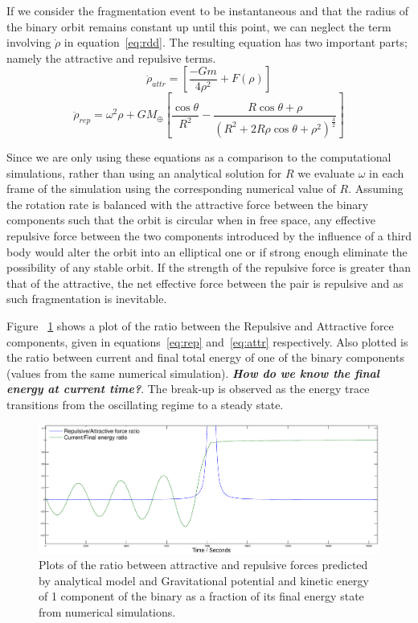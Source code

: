 \documentclass[letterpaper, preprint, paper,11pt]{AAS}	%
\begin{document}
If we consider the fragmentation event to be instantaneous and that the radius of the binary orbit remains constant up until this point, we can neglect the term involving $\dot{\rho}$ in equation~\ref{eq:rdd}. The resulting equation has two important parts; namely the attractive and repulsive terms.
\begin{equation} \label{eq:attr}
\ddot{\rho}_{attr} = \left[\frac{-Gm}{4\rho^{2}}+F(\rho)\right]
\end{equation}
\begin{equation} \label{eq:rep}
\ddot{\rho}_{rep} = \omega^{2}\rho+{GM_\oplus}\left[\frac{\cos\theta}{R^{2}}-\frac{R\cos\theta+\rho}{(R^{2}+2R\rho\cos\theta+\rho^{2})^\frac{3}{2}}\right]
\end{equation}

Since we are only using these equations as a comparison to the computational simulations, rather than using an analytical solution for $R$ we evaluate $\omega$ in each frame of the simulation using the corresponding numerical value of $R$. Assuming the rotation rate is balanced with the attractive force between the binary components such that the orbit is circular when in free space, any effective repulsive force between the two components introduced by the influence of a third body would alter the orbit into an elliptical one or if strong enough eliminate the possibility of any stable orbit. If the strength of the repulsive force is greater than that of the attractive, the net effective force between the pair is repulsive and as such fragmentation is inevitable. 

Figure ~\ref{fig:Analy} shows a plot of the ratio between the Repulsive and Attractive force components, given in equations~\ref{eq:rep} and~\ref{eq:attr} respectively. Also plotted is the ratio between current and final total energy of one of the binary components (values from the same numerical simulation). \textbf{\emph{How do we know the final energy at current time?}}. The break-up is observed as the energy trace transitions from the oscillating regime to a steady state.
\begin{figure}[H]
\centering
\includegraphics[width=\textwidth]{binary_analy.eps} 
\caption{Plots of the ratio between attractive and repulsive forces predicted by analytical model and Gravitational potential and kinetic energy of 1 component of the binary as a fraction of its final energy state from numerical simulations.} 
\label{fig:Analy}
\end{figure} 
\end{document}
